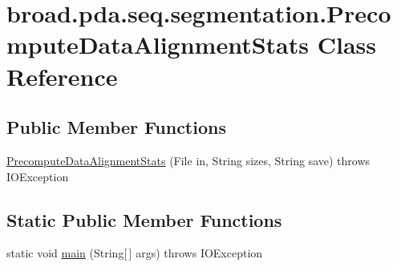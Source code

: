 \hypertarget{classbroad_1_1pda_1_1seq_1_1segmentation_1_1_precompute_data_alignment_stats}{\section{broad.\+pda.\+seq.\+segmentation.\+Precompute\+Data\+Alignment\+Stats Class Reference}
\label{classbroad_1_1pda_1_1seq_1_1segmentation_1_1_precompute_data_alignment_stats}
}
\subsection*{Public Member Functions}
\begin{DoxyCompactItemize}
\item 
\hyperlink{classbroad_1_1pda_1_1seq_1_1segmentation_1_1_precompute_data_alignment_stats_aac08c10013b3b848f98d9b91b54c0af7}{Precompute\+Data\+Alignment\+Stats} (File in, String sizes, String save)  throws I\+O\+Exception
\end{DoxyCompactItemize}
\subsection*{Static Public Member Functions}
\begin{DoxyCompactItemize}
\item 
static void \hyperlink{classbroad_1_1pda_1_1seq_1_1segmentation_1_1_precompute_data_alignment_stats_aa14baef82753f2755d18332b4b7f186c}{main} (String\mbox{[}$\,$\mbox{]} args)  throws I\+O\+Exception
\end{DoxyCompactItemize}


